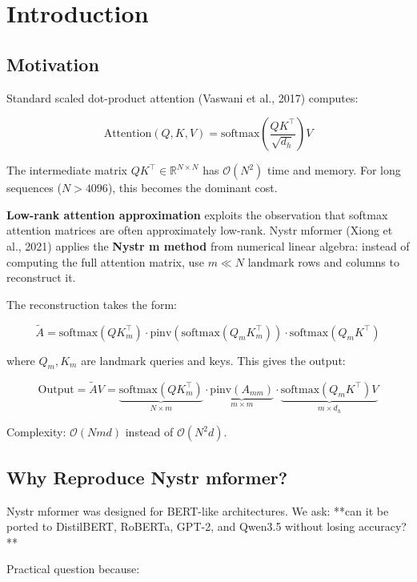 
\section{Introduction}

\subsection{Motivation}

Standard scaled dot-product attention (Vaswani et al., 2017) computes:

\[
\mathrm{Attention}(Q, K, V) = \mathrm{softmax}\!\left(\frac{Q K^\top}{\sqrt{d_h}}\right) V
\tag{1.1}
\]

The intermediate matrix $Q K^\top \in \mathbb{R}^{N \times N}$ has 
$\mathcal{O}(N^2)$ time and memory. For long sequences ($N > 4096$), this 
becomes the dominant cost.

\textbf{Low-rank attention approximation} exploits the observation that softmax 
attention matrices are often approximately low-rank. Nystr mformer (Xiong 
et al., 2021) applies the \textbf{Nystr m method} from numerical linear algebra: 
instead of computing the full attention matrix, use $m \ll N$ landmark 
rows and columns to reconstruct it.

The reconstruction takes the form:

\[
\tilde{A} = \text{softmax}(Q K_m^\top) \cdot \text{pinv}(\text{softmax}(Q_m K_m^\top)) \cdot \text{softmax}(Q_m K^\top)
\tag{1.2}
\]

where $Q_m, K_m$ are landmark queries and keys. This gives the output:

\[
\text{Output} = \tilde{A} V = \underbrace{\text{softmax}(Q K_m^\top)}_{N \times m} \cdot \underbrace{\text{pinv}(A_{mm})}_{m \times m} \cdot \underbrace{\text{softmax}(Q_m K^\top) V}_{m \times d_h}
\tag{1.3}
\]

Complexity: $\mathcal{O}(N m d)$ instead of $\mathcal{O}(N^2 d)$.

\subsection{Why Reproduce Nystr mformer?}

Nystr mformer was designed for BERT-like architectures. We ask: **can it 
be ported to DistilBERT, RoBERTa, GPT-2, and Qwen3.5 without losing 
accuracy?**

Practical question because:

